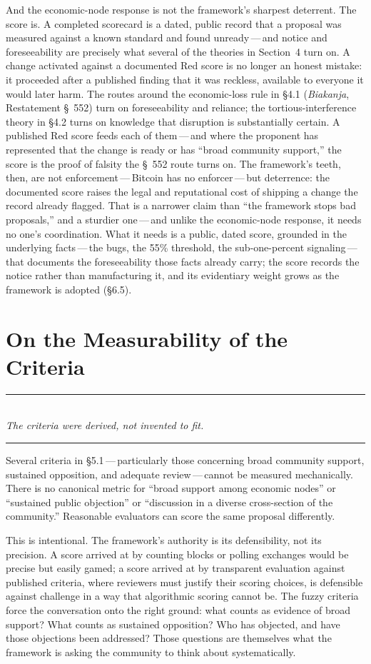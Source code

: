 \documentclass[11pt, twoside, openright]{book}
\newcommand{\sect}[1]{\S#1}
\newcommand{\pullquote}[1]{%
  \begin{center}
  {\color{bitcoinorange}\rule{1.4cm}{0.8pt}}\\[5pt]
  {\itshape\large #1}\\[5pt]
  {\color{bitcoinorange}\rule{1.4cm}{0.8pt}}
  \end{center}}
\begin{document}
And the economic-node response is not the framework's sharpest deterrent. The score is. A completed scorecard is a dated, public record that a proposal was measured against a known standard and found unready\,---\,and notice and foreseeability are precisely what several of the theories in Section~4 turn on. A change activated against a documented Red score is no longer an honest mistake: it proceeded after a published finding that it was reckless, available to everyone it would later harm. The routes around the economic-loss rule in \sect{4.1} (\textit{Biakanja}, Restatement \S~552) turn on foreseeability and reliance; the tortious-interference theory in \sect{4.2} turns on knowledge that disruption is substantially certain. A published Red score feeds each of them\,---\,and where the proponent has represented that the change is ready or has ``broad community support,'' the score is the proof of falsity the \S~552 route turns on. The framework's teeth, then, are not enforcement\,---\,Bitcoin has no enforcer\,---\,but deterrence: the documented score raises the legal and reputational cost of shipping a change the record already flagged. That is a narrower claim than ``the framework stops bad proposals,'' and a sturdier one\,---\,and unlike the economic-node response, it needs no one's coordination. What it needs is a public, dated score, grounded in the underlying facts\,---\,the bugs, the 55\% threshold, the sub-one-percent signaling\,---\,that documents the foreseeability those facts already carry; the score records the notice rather than manufacturing it, and its evidentiary weight grows as the framework is adopted (\sect{6.5}).

\section{On the Measurability of the Criteria}

\pullquote{The criteria were derived, not invented to fit.}

Several criteria in \sect{5.1}\,---\,particularly those concerning broad community support, sustained opposition, and adequate review\,---\,cannot be measured mechanically. There is no canonical metric for ``broad support among economic nodes'' or ``sustained public objection'' or ``discussion in a diverse cross-section of the community.'' Reasonable evaluators can score the same proposal differently.

This is intentional. The framework's authority is its defensibility, not its precision. A score arrived at by counting blocks or polling exchanges would be precise but easily gamed; a score arrived at by transparent evaluation against published criteria, where reviewers must justify their scoring choices, is defensible against challenge in a way that algorithmic scoring cannot be. The fuzzy criteria force the conversation onto the right ground: what counts as evidence of broad support? What counts as sustained opposition? Who has objected, and have those objections been addressed? Those questions are themselves what the framework is asking the community to think about systematically.
\end{document}
